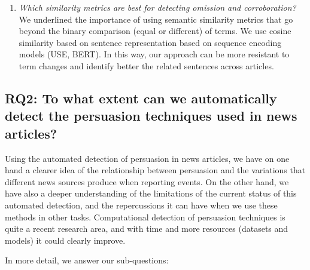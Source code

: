 \begin{enumerate}[label={\textbf{RQ1.\arabic*:}},leftmargin=2cm]
    \item \emph{Which similarity metrics are best for detecting omission and corroboration?} We underlined %
          the importance of using semantic similarity metrics that go beyond the binary comparison (equal or different) of terms. We use cosine similarity based on sentence representation based on sequence encoding models (USE, BERT). In this way, our approach can be more resistant to term changes and identify better the related sentences across articles.
\end{enumerate}


\subsection*{RQ2: To what extent can we automatically detect the persuasion techniques used in news articles?}

Using the automated detection of persuasion in news articles, we have on one hand a clearer idea of the relationship between persuasion and the variations that different news sources produce when reporting events.
On the other hand, we have also a deeper understanding of the limitations of the current status of this automated detection, and the repercussions it can have when we use these methods in other tasks.
Computational detection of persuasion techniques is quite a recent research area, and with time and more resources (datasets and models) it could clearly improve.

In more detail, we answer our sub-questions:

